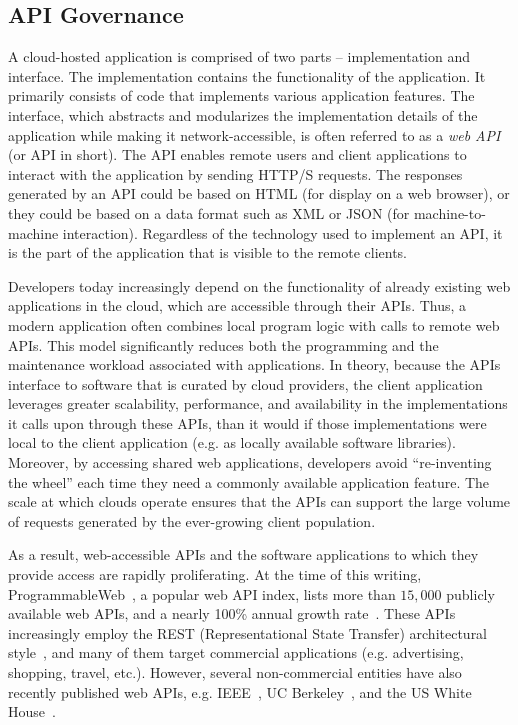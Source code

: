 \subsection{API Governance}
A cloud-hosted application is comprised of two parts -- implementation and interface. The implementation
contains the functionality of the application. It primarily consists of code that implements
various application features. 
The interface, which abstracts and modularizes the implementation details of the application while making
it network-accessible, is often referred to as a \textit{web API} (or API in short). 
The API enables remote users and client applications to interact with the application by sending
HTTP/S requests. The responses generated by an API could be based on HTML (for display on a web
browser), or they could be based on a data format such as XML or JSON (for machine-to-machine 
interaction). Regardless of the technology used to implement an API, it is the part of the application 
that is visible to the remote clients. 

Developers today
increasingly depend on the functionality of already existing web applications in the cloud, which
are accessible through their APIs. Thus, a modern application 
often combines local program logic with calls to remote web APIs. 
This model significantly reduces both the programming and
the maintenance workload associated with applications. In theory, because
the APIs interface to software that is curated by cloud providers, the client
application leverages greater scalability, performance, 
and availability in the implementations it calls upon through these APIs, than
it would if those implementations were local to the client application
(e.g. as locally available software libraries).
Moreover, by accessing shared web applications, developers avoid ``re-inventing the
wheel'' each time they need a commonly available application feature. The scale at
which clouds operate ensures that the APIs can support the large volume
of requests generated by the ever-growing client population.

As a result, web-accessible APIs and the software applications to which
they provide access are rapidly proliferating. At the time of this writing, 
ProgrammableWeb~\cite{pweb}, a popular web API index, lists more than $15,000$
publicly available web APIs, and a nearly 100\% annual growth rate~\cite{pweb_growth}.
These APIs increasingly employ the REST (Representational State Transfer) architectural style~\cite{Fielding:2000:ASD:932295}, and 
many of them target commercial applications (e.g. advertising, shopping, travel, etc.).
However, several non-commercial entities have also recently published web 
APIs, e.g. IEEE~\cite{ieeeapis}, UC Berkeley~\cite{ucbapis}, and the US White
House~\cite{whitehouseapis}. 

